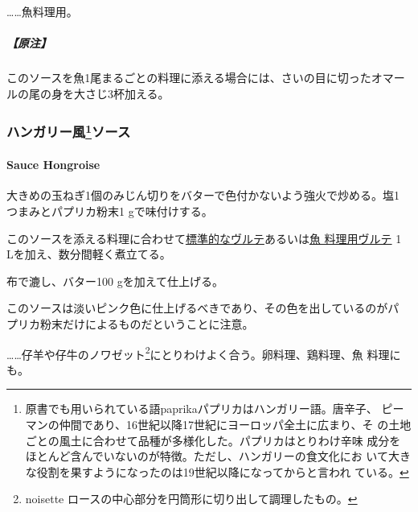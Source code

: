 \begin{recette}
\ldots{}\ldots{}魚料理用。

\hypertarget{ux539fux6ce8-10}{%
\subparagraph{【原注】}\label{ux539fux6ce8-10}}

このソースを魚1尾まるごとの料理に添える場合には、さいの目に切ったオマー
ルの尾の身を大さじ3杯加える。

\maeaki

\hypertarget{ux30cfux30f3ux30acux30eaux30fcux98a856ux30bdux30fcux30b9}{%
\subsubsection[ハンガリー風ソース]{\texorpdfstring{ハンガリー風\footnote{原書でも用いられている語paprikaパプリカはハンガリー語。唐辛子、
  ピーマンの仲間であり、16世紀以降17世紀にヨーロッパ全土に広まり、そ
  の土地ごとの風土に合わせて品種が多様化した。パプリカはとりわけ辛味
  成分をほとんど含んでいないのが特徴。ただし、ハンガリーの食文化にお
  いて大きな役割を果すようになったのは19世紀以降になってからと言われ
  ている。}ソース}{ハンガリー風ソース}}\label{ux30cfux30f3ux30acux30eaux30fcux98a856ux30bdux30fcux30b9}}

\hypertarget{sauce-hongroise}{%
\paragraph{Sauce Hongroise}\label{sauce-hongroise}}


大きめの玉ねぎ1個のみじん切りをバターで色付かないよう強火で炒める。塩1
つまみとパプリカ粉末1 gで味付けする。

このソースを添える料理に合わせて\protect\hyperlink{veloute}{標準的なヴルテ}あるいは\protect\hyperlink{veloute-de-poisson}{魚
料理用ヴルテ} 1 Lを加え、数分間軽く煮立てる。

布で漉し、バター100 gを加えて仕上げる。

このソースは淡いピンク色に仕上げるべきであり、その色を出しているのがパ
プリカ粉末だけによるものだということに注意。

\ldots{}\ldots{}仔羊や仔牛のノワゼット\footnote{noisette
  ロースの中心部分を円筒形に切り出して調理したもの。}にとりわけよく合う。卵料理、鶏料理、魚
料理にも。

\maeaki

\hypertarget{ux7261ux8823ux5165ux308aux30bdux30fcux30b9}{%
}
\end{recette}
